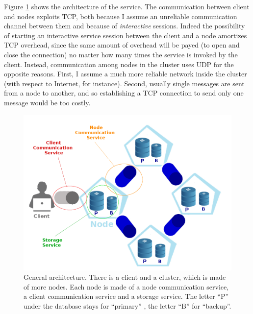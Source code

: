 \documentclass{article}
\begin{document}
Figure \ref{fig:architecture} shows the architecture of the service. The communication between client and nodes exploits TCP, both because I assume an unreliable communication channel between them and because of \textit{interactive} sessions. Indeed the possibility of starting an interactive service session between the client and a node amortizes TCP overhead, since the same amount of overhead will be payed (to open and close the connection) no matter how many times the service is invoked by the client. Instead, communication among nodes in the cluster uses UDP for the opposite reasons. First, I assume a much more reliable network inside the cluster (with respect to Internet, for instance). Second, usually single messages are sent from a node to another, and so establishing a TCP connection to send only one message would be too costly.

\begin{figure}[h]
\includegraphics[scale=0.41]{architecture}
\caption{General architecture. There is a client and a cluster, which is made of more nodes. Each node is made of a node communication service, a client communication service and a storage service. The letter ``P'' under the database stays for ``primary'' , the letter ``B'' for ``backup''.}
\label{fig:architecture}
\end{figure}
\end{document}
